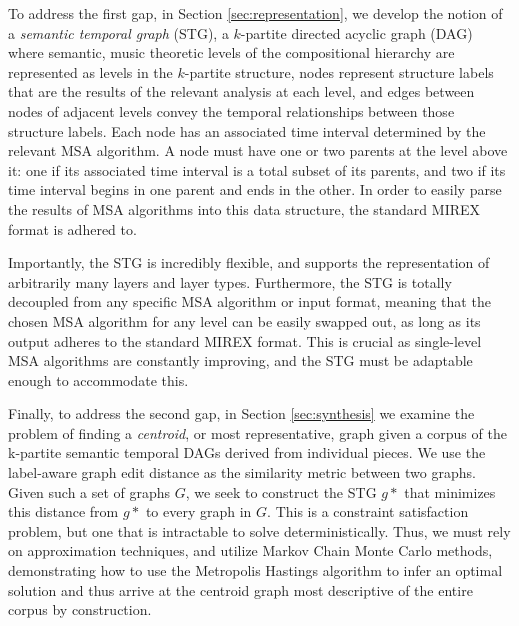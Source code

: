 \documentclass{article}
\begin{document}
To address the first gap, in Section \ref{sec:representation}, we develop the notion of a \textit{semantic temporal graph} (STG), a $k$-partite directed acyclic graph (DAG) where semantic, music theoretic levels of the compositional hierarchy are represented as levels in the $k$-partite structure, nodes represent structure labels that are the results of the relevant analysis at each level, and edges between nodes of adjacent levels convey the temporal relationships between those structure labels. Each node has an associated time interval determined by the relevant MSA algorithm. A node must have one or two parents at the level above it: one if its associated time interval is a total subset of its parents, and two if its time interval begins in one parent and ends in the other. In order to easily parse the results of MSA algorithms into this data structure, the standard MIREX format is adhered to.

Importantly, the STG is incredibly flexible, and supports the representation of arbitrarily many layers and layer types. Furthermore, the STG is totally decoupled from any specific MSA algorithm or input format, meaning that the chosen MSA algorithm for any level can be easily swapped out, as long as its output adheres to the standard MIREX format. This is crucial as single-level MSA algorithms are constantly improving, and the STG must be adaptable enough to accommodate this.

Finally, to address the second gap, in Section \ref{sec:synthesis} we examine the problem of finding a \textit{centroid}, or most representative, graph given a corpus of the k-partite semantic temporal DAGs derived from individual pieces. We use the label-aware graph edit distance as the similarity metric between two graphs. Given such a set of graphs $G$, we seek to construct the STG $g*$ that minimizes this distance from $g*$ to every graph in $G$. This is a constraint satisfaction problem, but one that is intractable to solve deterministically. Thus, we must rely on approximation techniques, and utilize Markov Chain Monte Carlo methods, demonstrating how to use the Metropolis Hastings algorithm to infer an optimal solution and thus arrive at the centroid graph most descriptive of the entire corpus by construction. 
\end{document}
